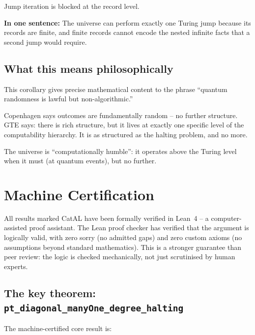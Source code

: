 \documentclass[11pt,a4paper]{article}
\newcommand{\lean}[1]{\texttt{#1}}
\begin{document}
Jump iteration is blocked at the record level.

\medskip\noindent\textbf{In one sentence:}
The universe can perform exactly one Turing jump because its records are
finite, and finite records cannot encode the nested infinite facts that a
second jump would require.

\subsection{What this means philosophically}

This corollary gives precise mathematical content to the phrase ``quantum
randomness is lawful but non-algorithmic.''

Copenhagen says outcomes are fundamentally random -- no further structure.
GTE says: there is rich structure, but it lives at exactly one specific level
of the computability hierarchy.  It is as structured as the halting problem,
and no more.

The universe is ``computationally humble'': it operates above the Turing
level when it must (at quantum events), but no further.

\section{Machine Certification}
\label{sec:lean}

\begin{tcolorbox}[colback=boxgray,colframe=gray!50,
  title=What Machine Certification Means]
All results marked CatAL have been formally verified in Lean~4 -- a
computer-assisted proof assistant. The Lean proof checker has verified
that the argument is logically valid, with zero sorry (no admitted gaps)
and zero custom axioms (no assumptions beyond standard mathematics).
This is a stronger guarantee than peer review: the logic is checked
mechanically, not just scrutinised by human experts.
\end{tcolorbox}

\subsection{The key theorem: \lean{pt\_diagonal\_manyOne\_degree\_halting}}

The machine-certified core result is:
\end{document}
